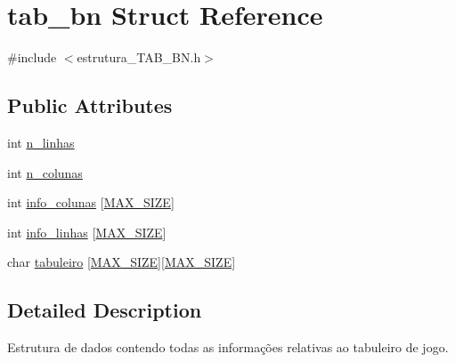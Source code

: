 \hypertarget{structtab__bn}{\section{tab\-\_\-bn Struct Reference}
\label{structtab__bn}
}


{\ttfamily \#include $<$estrutura\-\_\-\-T\-A\-B\-\_\-\-B\-N.\-h$>$}

\subsection*{Public Attributes}
\begin{DoxyCompactItemize}
\item 
int \hyperlink{structtab__bn_a986e57359e4e4630edd0994d615b3eaa}{n\-\_\-linhas}
\item 
int \hyperlink{structtab__bn_a42bb71ad662aa571a66445b1d81d481e}{n\-\_\-colunas}
\item 
int \hyperlink{structtab__bn_a5db4acd87d1a3dfc8b334e3d8564107b}{info\-\_\-colunas} \mbox{[}\hyperlink{stel_8h_a0592dba56693fad79136250c11e5a7fe}{M\-A\-X\-\_\-\-S\-I\-Z\-E}\mbox{]}
\item 
int \hyperlink{structtab__bn_a0f37b7b7a722455c0d5fdb3a0b21eb18}{info\-\_\-linhas} \mbox{[}\hyperlink{stel_8h_a0592dba56693fad79136250c11e5a7fe}{M\-A\-X\-\_\-\-S\-I\-Z\-E}\mbox{]}
\item 
char \hyperlink{structtab__bn_a35d0fd28d6f47a6705a24fbcbdde4d63}{tabuleiro} \mbox{[}\hyperlink{stel_8h_a0592dba56693fad79136250c11e5a7fe}{M\-A\-X\-\_\-\-S\-I\-Z\-E}\mbox{]}\mbox{[}\hyperlink{stel_8h_a0592dba56693fad79136250c11e5a7fe}{M\-A\-X\-\_\-\-S\-I\-Z\-E}\mbox{]}
\end{DoxyCompactItemize}


\subsection{Detailed Description}
Estrutura de dados contendo todas as informações relativas ao tabuleiro de jogo. 

